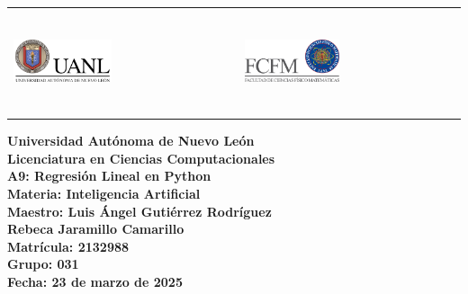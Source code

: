 \documentclass{article}
\begin{document}
\begin{titlepage}
    
    \noindent %
    \begin{tabular}{@{}p{} p{}@{}}
        \includegraphics[height=3cm, width=0.45\textwidth, keepaspectratio]{logos/uanl.png} & %
        \hfill \includegraphics[height=3cm, width=0.45\textwidth, keepaspectratio]{logos/fcfm.png} %
    \end{tabular}
    
    \begin{center}
        \vspace*{2cm} %
        \textbf{\Large Universidad Autónoma de Nuevo León} \\[2cm]
        
        \textbf{\Large Licenciatura en Ciencias Computacionales} \\[2cm]
        
        \textbf{\Large A9: Regresión Lineal en Python} \\[2cm]
    
        \textbf{\large Materia: Inteligencia Artificial} \\[.5cm]
        \textbf{\large Maestro: Luis Ángel Gutiérrez Rodríguez} \\[2cm]
        
        \textbf{\large Rebeca Jaramillo Camarillo} \\[.5cm]
        \textbf{\large Matrícula: 2132988} \\[.5cm]
        \textbf{\large Grupo: 031} \\
        
        \vfill %
        \textbf{\large Fecha: 23 de marzo de 2025} %
    \end{center}
	
\end{titlepage}
\end{document}
